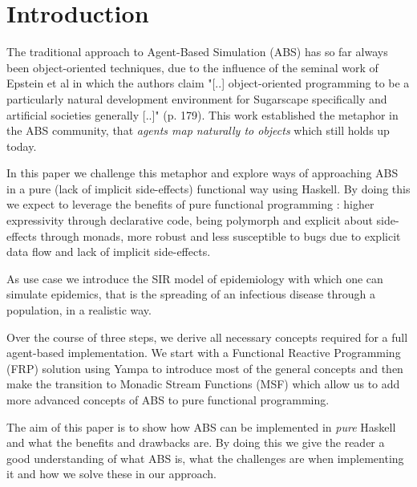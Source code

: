 \section{Introduction}
The traditional approach to Agent-Based Simulation (ABS) has so far always been object-oriented techniques, due to the influence of the seminal work of Epstein et al \cite{epstein_growing_1996} in which the authors claim "[..] object-oriented programming to be a particularly natural development environment for Sugarscape specifically and artificial societies generally [..]" (p. 179). This work established the metaphor in the ABS community, that \textit{agents map naturally to objects} \cite{north_managing_2007} which still holds up today.

In this paper we challenge this metaphor and explore ways of approaching ABS in a pure (lack of implicit side-effects) functional way using Haskell. By doing this we expect to leverage the benefits of pure functional programming \cite{hudak_history_2007}: higher expressivity through declarative code, being polymorph and explicit about side-effects through monads, more robust and less susceptible to bugs due to explicit data flow and lack of implicit side-effects.

As use case we introduce the SIR model of epidemiology with which one can simulate epidemics, that is the spreading of an infectious disease through a population, in a realistic way.

Over the course of three steps, we derive all necessary concepts required for a full agent-based implementation. We start with a Functional Reactive Programming (FRP) \cite{wan_functional_2000} solution using Yampa \cite{hudak_arrows_2003} to introduce most of the general concepts and then make the transition to Monadic Stream Functions (MSF) \cite{perez_functional_2016} which allow us to add more advanced concepts of ABS to pure functional programming.

The aim of this paper is to show how ABS can be implemented in \textit{pure} Haskell and what the benefits and drawbacks are. By doing this we give the reader a good understanding of what ABS is, what the challenges are when implementing it and how we solve these in our approach.

